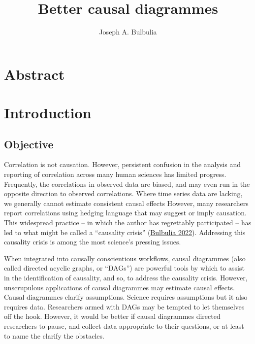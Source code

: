 \documentclass[
  singlecolumn]{report}
\title{Better causal diagrammes}
\author{Joseph A. Bulbulia}
\date{}
\begin{document}
\maketitle
\ifdefined\Shaded\renewenvironment{Shaded}{\begin{tcolorbox}[sharp corners, frame hidden, boxrule=0pt, interior hidden, borderline west={3pt}{0pt}{shadecolor}, breakable, enhanced]}{\end{tcolorbox}}\fi

\listoffigures
\listoftables
\hypertarget{abstract}{%
\section{Abstract}\label{abstract}}

\hypertarget{introduction}{%
\section{Introduction}\label{introduction}}

\hypertarget{objective}{%
\subsection{Objective}\label{objective}}

Correlation is not causation. However, persistent confusion in the
analysis and reporting of correlation across many human sciences has
limited progress. Frequently, the correlations in observed data are
biased, and may even run in the opposite direction to observed
correlations. Where time series data are lacking, we generally cannot
estimate consistent causal effects However, many researchers report
correlations using hedging language that may suggest or imply causation.
This widespread practice -- in which the author has regrettably
participated -- has led to what might be called a ``causality crisis''
(\protect\hyperlink{ref-bulbulia2022}{Bulbulia 2022}). Addressing this
causality crisis is among the most science's pressing issues.

When integrated into causally conscientious workflows, causal diagrammes
(also called directed acyclic graphs, or ``DAGs'') are powerful tools by
which to assist in the identification of causality, and so, to address
the causality crisis. However, unscrupulous applications of causal
diagrammes may estimate causal effects. Causal diagrammes clarify
assumptions. Science requires assumptions but it also requires data.
Researchers armed with DAGs may be tempted to let themselves off the
hook. However, it would be better if causal diagrammes directed
researchers to pause, and collect data appropriate to their questions,
or at least to name the clarify the obstacles.
\end{document}

